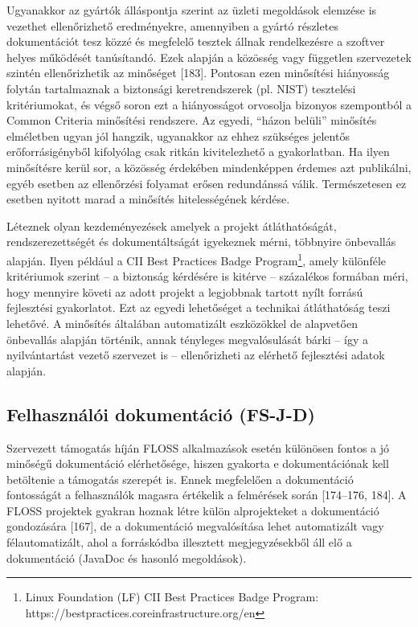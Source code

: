 \documentclass[12pt,magyar,a4paper,oneside]{scrreprt}
\begin{document}
Ugyanakkor az gyártók álláspontja szerint az üzleti megoldások elemzése
is vezethet ellenőrizhető eredményekre, amennyiben a gyártó részletes
dokumentációt tesz közzé és megfelelő tesztek állnak rendelkezésre a
szoftver helyes működését tanúsítandó. Ezek alapján a közösség vagy
független szervezetek szintén ellenőrizhetik az minőséget {[}183{]}.
Pontosan ezen minősítési hiányosság folytán tartalmaznak a biztonsági
keretrendszerek (pl. NIST) tesztelési kritériumokat, és végső soron ezt
a hiányosságot orvosolja bizonyos szempontból a Common Criteria
minősítési rendszere. Az egyedi, ``házon belüli'' minősítés elméletben
ugyan jól hangzik, ugyanakkor az ehhez szükséges jelentős
erőforrásigényből kifolyólag csak ritkán kivitelezhető a gyakorlatban.
Ha ilyen minősítésre kerül sor, a közösség érdekében mindenképpen
érdemes azt publikálni, egyéb esetben az ellenőrzési folyamat erősen
redundánssá válik. Természetesen ez esetben nyitott marad a minősítés
hitelességének kérdése.

Léteznek olyan kezdeményezések amelyek a projekt átláthatóságát,
rendszerezettségét és dokumentáltságát igyekeznek mérni, többnyire
önbevallás alapján. Ilyen például a CII Best Practices Badge
Program\footnote{Linux Foundation (LF) CII Best Practices Badge Program:
  https://bestpractices.coreinfrastructure.org/en}, amely különféle
kritériumok szerint -- a biztonság kérdésére is kitérve -- százalékos
formában méri, hogy mennyire követi az adott projekt a legjobbnak
tartott nyílt forrású fejlesztési gyakorlatot. Ezt az egyedi lehetőséget
a technikai átláthatóság teszi lehetővé. A minősítés általában
automatizált eszközökkel de alapvetően önbevallás alapján történik,
annak tényleges megvalósulását bárki -- így a nyilvántartást vezető
szervezet is -- ellenőrizheti az elérhető fejlesztési adatok alapján.

\hypertarget{sec:FS-J-D}{%
\subsection{Felhasználói dokumentáció (FS-J-D)}\label{sec:FS-J-D}}

Szervezett támogatás híján FLOSS alkalmazások esetén különösen fontos a
jó minőségű dokumentáció elérhetősége, hiszen gyakorta e dokumentációnak
kell betöltenie a támogatás szerepét is. Ennek megfelelően a
dokumentáció fontosságát a felhasználók magasra értékelik a felmérések
során {[}174--176, 184{]}. A FLOSS projektek gyakran hoznak létre külön
alprojekteket a dokumentáció gondozására {[}167{]}, de a dokumentáció
megvalósítása lehet automatizált vagy félautomatizált, ahol a
forráskódba illesztett megjegyzésekből áll elő a dokumentáció (JavaDoc
és hasonló megoldások).
\end{document}
